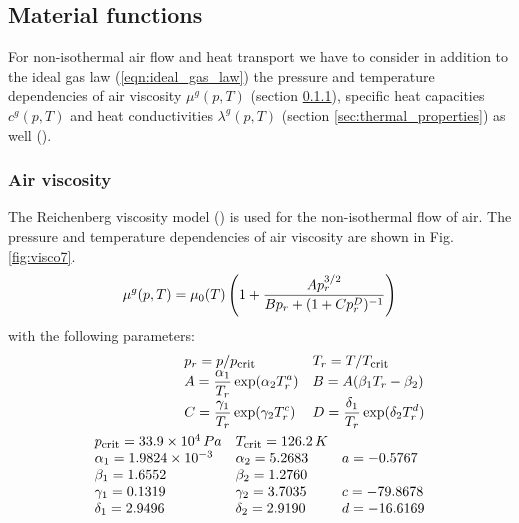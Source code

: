 \subsection{Material functions}
\label{sec:materials}

For non-isothermal air flow and heat transport we have to consider
in addition to the ideal gas law (\ref{eqn:ideal_gas_law}) the
pressure and temperature dependencies of air viscosity
$\mu^g(p,T)$ (section \ref{sec:viscosity}), specific heat
capacities $c^g(p,T)$ and heat
conductivities $\lambda^g(p,T)$ (section
\ref{sec:thermal_properties}) as well (\cite{McDermottEtAl:2006}).

\subsubsection{Air viscosity}
\label{sec:viscosity}

The Reichenberg viscosity model (\cite{ReidEtAl:1988}) is used for the
non-isothermal flow of air. The pressure and temperature
dependencies of air viscosity are shown in Fig. \ref{fig:visco7}.
%
\begin{eqnarray}
\mu^g (p,T)
=
\mu_0 (T)
\left(
1 + \frac{Ap_r^{3/2}}{Bp_r+(1+Cp_r^D)^{-1}}
\right)
\label{eqn:reichenberg_viscosity}
\end{eqnarray}
%
with the following parameters:
\begin{eqnarray}
\begin{array}{ll}
p_r = p / p_{\mbox{\footnotesize crit}}
&
T_r = T / T_{\mbox{\footnotesize crit}}
\\
A = \displaystyle\frac{\alpha_1}{T_r} \exp (\alpha_2 T_r^a)
&
B = A(\beta_1 T_r - \beta_2)
\\
C = \displaystyle\frac{\gamma_1}{T_r} \exp (\gamma_2 T_r^c)
&
D = \displaystyle\frac{\delta_1}{T_r} \exp (\delta_2 T_r^d)
\end{array}
\\
\begin{array}{lll}
p_{\mbox{\footnotesize crit}} = 33.9 \times 10^4 \, Pa
&
T_{\mbox{\footnotesize crit}} = 126.2 \, K
\\
\alpha_1 = 1.9824\times 10^{-3}  &  \alpha_2 = 5.2683  &  a = -0.5767 \\
\beta_1  = 1.6552               &  \beta_2  = 1.2760  &  \\
\gamma_1 = 0.1319                &  \gamma_2 = 3.7035  &  c = -79.8678 \\
\delta_1 = 2.9496                &  \delta_2 = 2.9190  &  d = -16.6169
\end{array}
\nonumber
\end{eqnarray}

